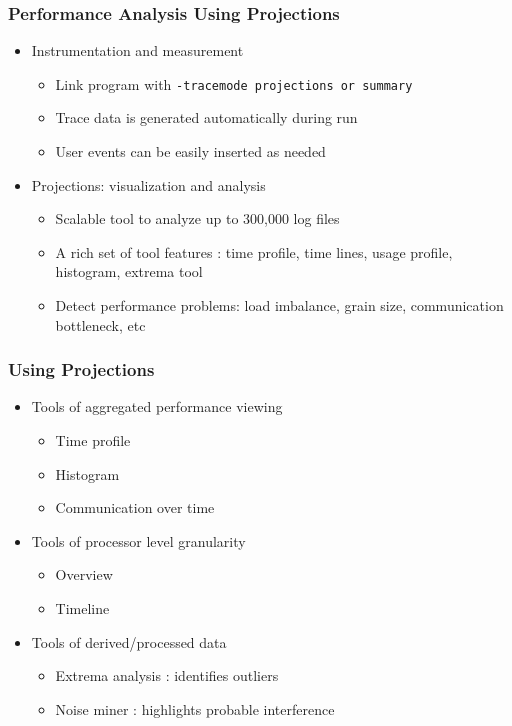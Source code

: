\begin{frame}
  \frametitle{Performance Analysis Using Projections}
  \begin{itemize}
  \item Instrumentation and measurement
  \begin{itemize}
  \item Link program with {\tt -tracemode projections or summary}
  \item Trace data is generated automatically during run
  \item User events can be easily inserted as needed
  \end{itemize}
  \item Projections: visualization and analysis
  \begin{itemize}
  \item Scalable tool to analyze up to 300,000 log files
  \item A rich set of tool features : time profile, time lines, usage profile, histogram, extrema tool
  \item Detect performance problems: load imbalance, grain size, communication bottleneck, etc 
  \end{itemize}
  \end{itemize}

\end{frame}

\begin{frame}
\frametitle{Using Projections }
 \begin{itemize}
  \item Tools of aggregated performance viewing
   \begin{itemize}
    \item Time profile
    \item Histogram
    \item Communication over time
   \end{itemize}
  \item Tools of processor level granularity
  \begin{itemize}
   \item Overview
   \item Timeline
  \end{itemize}
  \item Tools of derived/processed data
  \begin{itemize}
   \item Extrema analysis : identifies outliers
   \item Noise miner : highlights probable interference
  \end{itemize}
 \end{itemize}
\end{frame}

